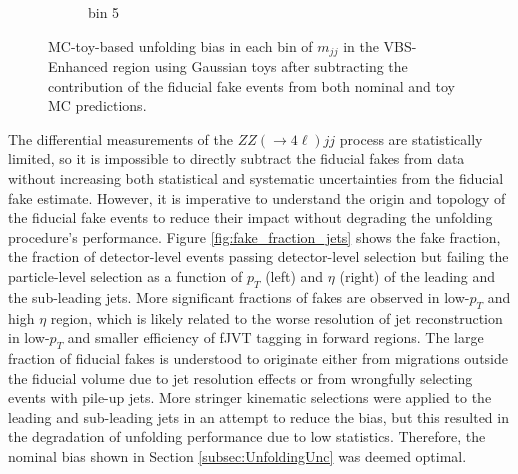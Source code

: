 \begin{figure}[htb]
\begin{subfigure}{.48\textwidth}
        \caption{bin 5 }
    \end{subfigure}
    \caption{ MC-toy-based unfolding bias in each bin of $m_{jj}$ in the VBS-Enhanced region using Gaussian toys after subtracting the contribution of the fiducial fake events from both nominal and toy MC predictions.\label{fig:UnfoldingBias_mjj_VBSEnhanced_noFakes}}
\end{figure}

The differential measurements of the $ZZ(\rightarrow 4\ell)jj$ process are statistically limited, so it is impossible to directly subtract the fiducial fakes from data without increasing both statistical and systematic uncertainties from the fiducial fake estimate. However, it is imperative to understand the origin and topology of the fiducial fake events to reduce their impact without degrading the unfolding procedure's performance. Figure \ref{fig:fake_fraction_jets} shows the fake fraction, the fraction of detector-level events passing detector-level selection but failing the particle-level selection as a function of $p_{T}$ (left) and $\eta$ (right) of the leading and the sub-leading jets. More significant fractions of fakes are observed in low-$p_{T}$ and high $\eta$ region, which is likely related to the worse resolution of jet reconstruction in low-$p_{T}$ and smaller efficiency of fJVT tagging in forward regions. The large fraction of fiducial fakes is understood to originate either from migrations outside the fiducial volume due to jet resolution effects or from wrongfully selecting events with pile-up jets. More stringer kinematic selections were applied to the leading and sub-leading jets in an attempt to reduce the bias, but this resulted in the degradation of unfolding performance due to low statistics. Therefore, the nominal bias shown in Section \ref{subsec:UnfoldingUnc} was deemed optimal. 

